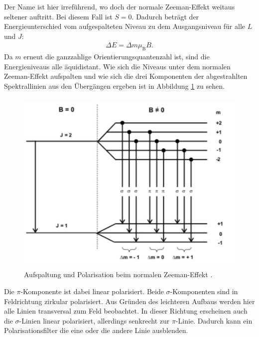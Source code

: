Der Name ist hier irreführend, wo doch der normale Zeeman-Effekt weitaus seltener auftritt. Bei diesem Fall ist $S=0$. Dadurch beträgt der Energieunterschied vom aufgespalteten Niveau zu dem Ausgangsniveau für alle $L$ und $J$:
\begin{align}
  \Delta E = \Delta m \mu_\text{B} B.
\end{align}
Da $m$ erneut die ganzzahlige Orientierungsquantenzahl ist, sind die Energieniveaus alle äquidistant. Wie sich die Niveaus unter dem normalen Zeeman-Effekt aufspalten und wie sich die drei Komponenten der abgestrahlten Spektrallinien aus den Übergängen ergeben ist in Abbildung \ref{fig:aufspaltung} zu sehen.
\begin{figure}
  \centering
  \includegraphics[height=9cm]{besuchInDerNacktmullAufzuchtstation/aufspaltung.pdf}
  \caption{Aufspaltung und Polarisation beim normalen Zeeman-Effekt \cite{anleitung}.}
  \label{fig:aufspaltung}
\end{figure}
Die $\pi$-Komponente ist dabei linear polarisiert. Beide $\sigma$-Komponenten sind in Feldrichtung zirkular polarisiert. Aus Gründen des leichteren Aufbaus werden hier alle Linien transversal zum Feld beobachtet. In dieser Richtung erscheinen auch die $\sigma$-Linien linear polarisiert, allerdings senkrecht zur $\pi$-Linie. Dadurch kann ein Polarisationsfilter die eine oder die andere Linie ausblenden.

